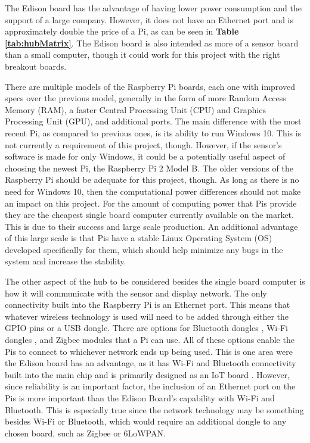 \documentclass[PPFS.tex]{template/subfiles}
\begin{document}
The Edison board has the advantage of having lower power consumption and the support of a large company. However, it does not have an Ethernet port and is approximately double the price of a Pi, as can be seen in \textbf{Table \ref{tab:hubMatrix}}. The Edison board is also intended as more of a sensor board than a small computer, though it could work for this project with the right breakout boards. \cite{Intel}

There are multiple models of the Raspberry Pi boards, each one with improved specs over the previous model, generally in the form of more Random Access Memory (RAM), a faster Central Processing Unit (CPU) and Graphics Processing Unit (GPU), and additional ports. The main difference with the most recent Pi, as compared to previous ones, is its ability to run Windows 10. This is not currently a requirement of this project, though. However, if the sensor's software is made for only Windows, it could be a potentially useful aspect of choosing the newest Pi, the Raspberry Pi 2 Model B. The older versions of the Raspberry Pi should be adequate for this project, though. As long as there is no need for Windows 10, then the computational power differences should not make an impact on this project. For the amount of computing power that Pis provide they are the cheapest single board computer currently available on the market. This is due to their success and large scale production. An additional advantage of this large scale is that Pis have a stable Linux Operating System (OS) developed specifically for them, which should help minimize any bugs in the system and increase the stability. \cite{RaspberryPi}

The other aspect of the hub to be considered besides the single board computer is how it will communicate with the sensor and display network. The only connectivity built into the Raspberry Pi is an Ethernet port. This means that whatever wireless technology is used will need to be added through either the GPIO pins or a USB dongle. There are options for Bluetooth dongles \cite{AdaFruit}, Wi-Fi dongles \cite{RaspberryPi}, and Zigbee modules \cite{Zigbee} that a Pi can use. All of these options enable the Pis to connect to whichever network ends up being used. This is one area were the Edison board has an advantage, as it has Wi-Fi and Bluetooth connectivity built into the main chip and is primarily designed as an IoT board \cite{Intel}. However, since reliability is an important factor, the inclusion of an Ethernet port on the Pis is more important than the Edison Board's capability with Wi-Fi and Bluetooth. This is especially true since the network technology may be something besides Wi-Fi or Bluetooth, which would require an additional dongle to any chosen board, such as Zigbee or 6LoWPAN.
\end{document}
